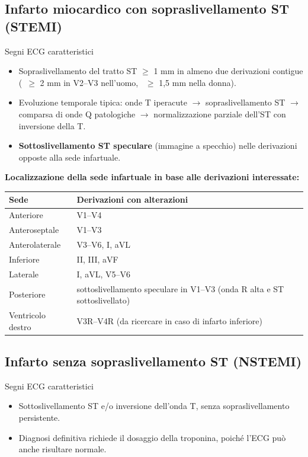 \documentclass[11pt,a4paper]{article}
\begin{document}
\subsection{Infarto miocardico con sopraslivellamento ST (STEMI)}
\begin{keybox}{Segni ECG caratteristici}
\begin{itemize}[leftmargin=1.2em]
  \item Sopraslivellamento del tratto ST $\geq$ 1 mm in almeno due derivazioni contigue (\ $\geq$ 2 mm in V2--V3 nell'uomo, \ $\geq$ 1,5 mm nella donna).
  \item Evoluzione temporale tipica: onde T iperacute $\rightarrow$ sopraslivellamento ST $\rightarrow$ comparsa di onde Q patologiche $\rightarrow$ normalizzazione parziale dell'ST con inversione della T.
  \item \textbf{Sottoslivellamento ST speculare} (immagine a specchio) nelle derivazioni opposte alla sede infartuale.
\end{itemize}
\end{keybox}

\textbf{Localizzazione della sede infartuale in base alle derivazioni interessate:}

\begin{tabularx}{\textwidth}{@{}l X@{}}
\toprule
\textbf{Sede} & \textbf{Derivazioni con alterazioni} \\
\midrule
Anteriore & V1--V4 \\
Anteroseptale & V1--V3 \\
Anterolaterale & V3--V6, I, aVL \\
Inferiore & II, III, aVF \\
Laterale & I, aVL, V5--V6 \\
Posteriore & sottoslivellamento speculare in V1--V3 (onda R alta e ST sottoslivellato) \\
Ventricolo destro & V3R--V4R (da ricercare in caso di infarto inferiore) \\
\bottomrule
\end{tabularx}

\subsection{Infarto senza sopraslivellamento ST (NSTEMI)}
\begin{keybox}{Segni ECG caratteristici}
\begin{itemize}[leftmargin=1.2em]
  \item Sottoslivellamento ST e/o inversione dell'onda T, senza sopraslivellamento persistente.
  \item Diagnosi definitiva richiede il dosaggio della troponina, poiché l'ECG può anche risultare normale.
\end{itemize}
\end{keybox}
\end{document}
